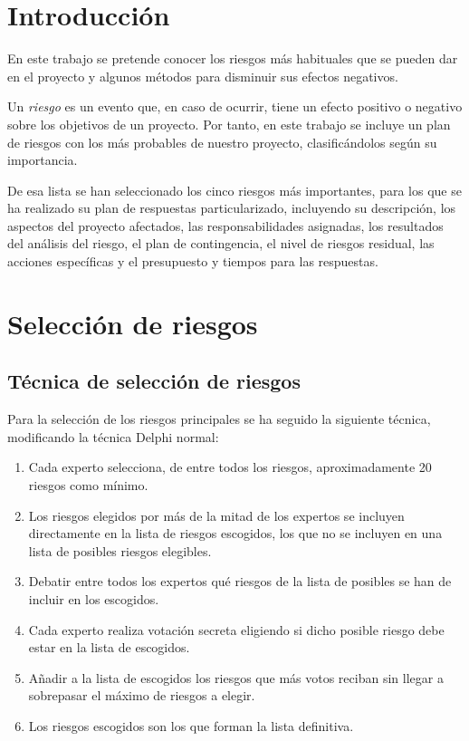 \documentclass[11pt,a4paper,spanish,twoside]{report}
\begin{document}
\tableofcontents
\listoftables
\listoffigures


\chapter*{Introducción}

En este trabajo se pretende conocer los riesgos más habituales que se pueden 
dar en el proyecto y algunos métodos para disminuir sus efectos negativos.

Un \emph{riesgo} es un evento que, en caso de ocurrir, tiene un efecto positivo o 
negativo sobre los objetivos de un proyecto. Por tanto, en este trabajo se 
incluye un plan de riesgos con los más probables de nuestro proyecto, 
clasificándolos según su importancia.

De esa lista se han seleccionado los cinco riesgos más importantes, para los
que se ha realizado su plan de respuestas particularizado, incluyendo su 
descripción, los aspectos del proyecto afectados, las responsabilidades 
asignadas, los resultados del análisis del riesgo, el plan de contingencia,
el nivel de riesgos residual, las acciones específicas y el presupuesto y 
tiempos para las respuestas.

\chapter{Selección de riesgos}
\section{Técnica de selección de riesgos}
Para la selección de los riesgos principales se ha seguido la siguiente 
técnica, modificando la técnica Delphi normal:

\begin{enumerate}
\item Cada experto selecciona, de entre todos los riesgos, aproximadamente 
20 riesgos como mínimo.
\item Los riesgos elegidos por más de la mitad de los expertos se incluyen 
directamente en la lista de riesgos escogidos, los que no se incluyen en una 
lista de posibles riesgos elegibles.
\item Debatir entre todos los expertos qué riesgos de la lista de posibles se 
han de incluir en los escogidos. 
\item Cada experto realiza votación secreta eligiendo si dicho posible riesgo 
debe estar en la lista de escogidos.
\item Añadir a la lista de escogidos los riesgos que más votos reciban sin 
llegar a sobrepasar el máximo de riesgos a elegir.
\item Los riesgos escogidos son los que forman la lista definitiva.
\end{enumerate}
\end{document}
